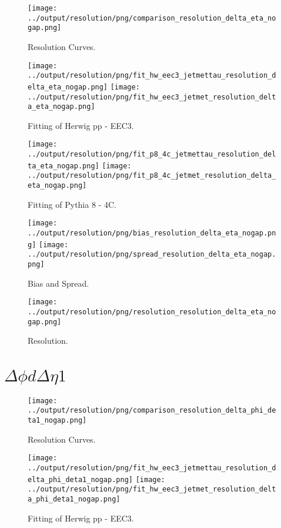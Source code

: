 \documentclass[11pt]{book}
\begin{document}
\begin{figure}[ht]
\centering
\texttt{[image: ../output/resolution/png/comparison\_resolution\_delta\_eta\_nogap.png]}
\caption{Resolution Curves.}
\end{figure}


\begin{figure}[ht]
\centering
\texttt{[image: ../output/resolution/png/fit\_hw\_eec3\_jetmettau\_resolution\_delta\_eta\_nogap.png]}
\texttt{[image: ../output/resolution/png/fit\_hw\_eec3\_jetmet\_resolution\_delta\_eta\_nogap.png]}
\caption{Fitting of Herwig pp - EEC3.}
\end{figure}

\begin{figure}[ht]
\centering
\texttt{[image: ../output/resolution/png/fit\_p8\_4c\_jetmettau\_resolution\_delta\_eta\_nogap.png]}
\texttt{[image: ../output/resolution/png/fit\_p8\_4c\_jetmet\_resolution\_delta\_eta\_nogap.png]}
\caption{Fitting of Pythia 8 - 4C.}
\end{figure}

\begin{figure}[ht]
\centering
\texttt{[image: ../output/resolution/png/bias\_resolution\_delta\_eta\_nogap.png]}
\texttt{[image: ../output/resolution/png/spread\_resolution\_delta\_eta\_nogap.png]}
\caption{Bias and Spread.}
\end{figure}


\begin{figure}[ht]
\centering
\texttt{[image: ../output/resolution/png/resolution\_resolution\_delta\_eta\_nogap.png]}
\caption{Resolution.}
\end{figure}
\clearpage


\section{$\Delta\phi d\Delta\eta 1$}

\begin{figure}[ht]
\centering
\texttt{[image: ../output/resolution/png/comparison\_resolution\_delta\_phi\_deta1\_nogap.png]}
\caption{Resolution Curves.}
\end{figure}


\begin{figure}[ht]
\centering
\texttt{[image: ../output/resolution/png/fit\_hw\_eec3\_jetmettau\_resolution\_delta\_phi\_deta1\_nogap.png]}
\texttt{[image: ../output/resolution/png/fit\_hw\_eec3\_jetmet\_resolution\_delta\_phi\_deta1\_nogap.png]}
\caption{Fitting of Herwig pp - EEC3.}
\end{figure}
\end{document}
